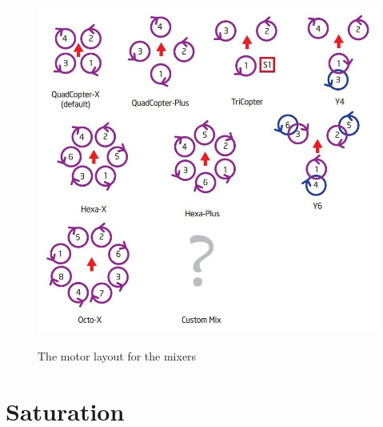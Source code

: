 \documentclass[paper=a4, fontsize=11pt]{scrartcl} %
\numberwithin{equation}{section} %
\numberwithin{figure}{section} %
\numberwithin{table}{section} %
\begin{document}
\begin{figure}[h]
	\centering
	\includegraphics[scale=0.3]{./fig/motor_layout.jpg}
	\label{fig:motor_layout}
	\caption{The motor layout for the mixers}
\end{figure}

\section{Saturation}
\end{document}
